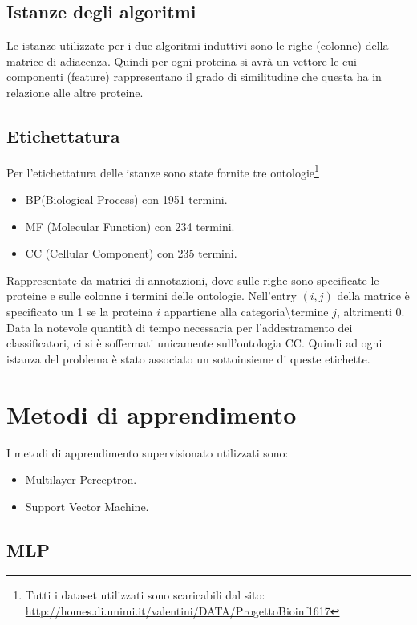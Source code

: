 \documentclass{article}
\begin{document}
\subsection{Istanze degli algoritmi}
Le istanze utilizzate per i due algoritmi induttivi sono le righe (colonne) della matrice di adiacenza. Quindi per ogni proteina si avrà un vettore le cui componenti (feature) rappresentano il grado di similitudine che questa ha in relazione alle altre proteine. 

\subsection{Etichettatura}
Per l'etichettatura delle istanze sono state fornite tre ontologie\footnote{Tutti i dataset utilizzati sono scaricabili dal sito:
\url{http://homes.di.unimi.it/valentini/DATA/ProgettoBioinf1617}}
\begin{itemize}
\item BP(Biological Process) con 1951 termini.
\item MF (Molecular Function) con 234 termini.
\item CC (Cellular Component) con 235 termini.
\end{itemize} 
Rappresentate da matrici di annotazioni, dove sulle righe sono specificate le proteine e sulle colonne i termini delle ontologie. Nell'entry $(i,j)$ della matrice è specificato un 1 se la proteina $i$ appartiene alla categoria\textbackslash termine $j$, altrimenti 0.
\newline
\newline
Data la notevole quantità di tempo necessaria per l'addestramento dei classificatori, ci si è soffermati unicamente sull'ontologia CC. Quindi ad ogni istanza del problema è stato associato un sottoinsieme di queste etichette.

\section{Metodi di apprendimento}

I metodi di apprendimento supervisionato utilizzati sono:
\begin{itemize}
\item Multilayer Perceptron.
\item Support Vector Machine.
\end{itemize}

\subsection{MLP}
\end{document}
